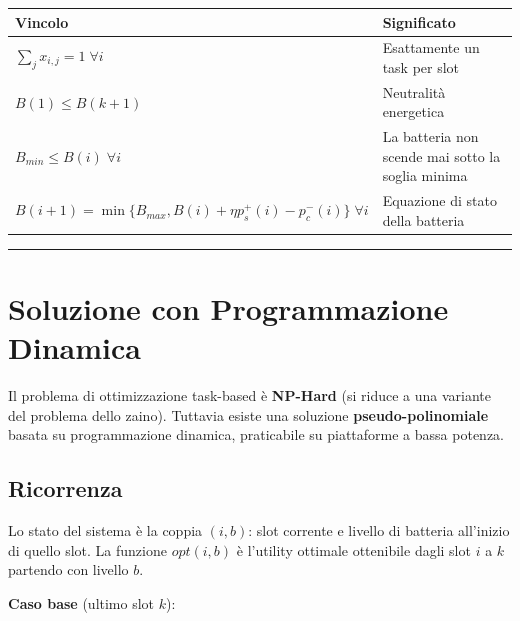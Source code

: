 \documentclass[
  italian,
  openany]{book}
\newcounter{none} %
\begin{document}
{\def\LTcaptype{none} %
\begin{longtable}[]{@{}
  >{\raggedright\arraybackslash}p{}
  >{\raggedright\arraybackslash}p{}@{}}
\toprule\noalign{}
\begin{minipage}[b]{\linewidth}\raggedright
Vincolo
\end{minipage} & \begin{minipage}[b]{\linewidth}\raggedright
Significato
\end{minipage} \\
\midrule\noalign{}
\endhead
\bottomrule\noalign{}
\endlastfoot
\(\sum_j x_{i,j} = 1 \; \forall i\) & Esattamente un task per slot \\
\(B(1) \leq B(k+1)\) & Neutralità energetica \\
\(B_{min} \leq B(i) \; \forall i\) & La batteria non scende mai sotto la
soglia minima \\
\(B(i+1) = \min\{B_{max}, B(i) + \eta p_s^+(i) - p_c^-(i)\} \; \forall i\)
& Equazione di stato della batteria \\
\end{longtable}
}

\begin{center}\rule{0.5\linewidth}{0.5pt}\end{center}

\section{Soluzione con Programmazione
Dinamica}\label{soluzione-con-programmazione-dinamica}

Il problema di ottimizzazione task-based è \textbf{NP-Hard} (si riduce a
una variante del problema dello zaino). Tuttavia esiste una soluzione
\textbf{pseudo-polinomiale} basata su programmazione dinamica,
praticabile su piattaforme a bassa potenza.

\subsection{Ricorrenza}\label{ricorrenza}

Lo stato del sistema è la coppia \((i, b)\): slot corrente e livello di
batteria all'inizio di quello slot. La funzione \(opt(i, b)\) è
l'utility ottimale ottenibile dagli slot \(i\) a \(k\) partendo con
livello \(b\).

\textbf{Caso base} (ultimo slot \(k\)):
\end{document}
